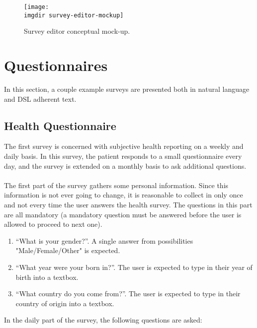 \begin{figure}[!ht]
  \centering
  \texttt{[image: \\imgdir survey-editor-mockup]}
  \caption{Survey editor conceptual mock-up.}
  \label{fig:survey-editor-mockup}
\end{figure}

\section{Questionnaires}
\label{sec:questionnaires}
In this section, a couple example surveys are presented both in natural language and DSL adherent text.

\subsection{Health Questionnaire}
\label{subsec:healthquestionnaire}
The first survey is concerned with subjective health reporting on a weekly and daily basis. In this survey, the patient responds to a small questionnaire every day, and the survey is extended on a monthly basis to ask additional questions.\\\\
The first part of the survey gathers some personal information. Since this information is not ever going to change, it is reasonable to collect in only once and not every time the user answers the health survey. The questions in this part are all mandatory (a mandatory question must be answered before the user is allowed to proceed to next one).

\begin{enumerate}
\item ``What is your gender?''. A single answer from possibilities "Male/Female/Other" is expected.
\item ``What year were your born in?''. The user is expected to type in their year of birth into a textbox.
\item ``What country do you come from?''. The user is expected to type in their country of origin into a textbox.
\end{enumerate}

In the daily part of the survey, the following questions are asked: 

